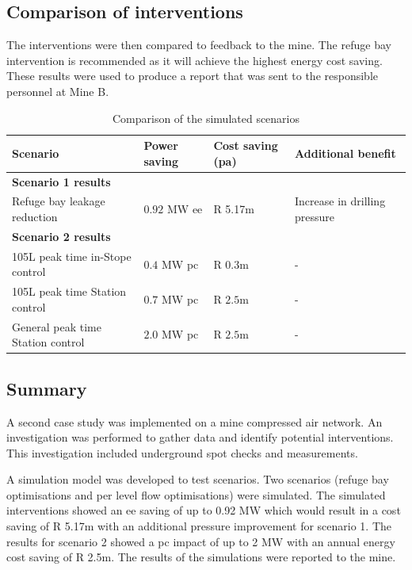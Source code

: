 	\subsection{Comparison of interventions}
	The interventions were then compared to feedback to the mine. The refuge bay intervention is recommended as it will achieve the highest energy cost saving. These results were used to produce a report that was sent to the responsible personnel at Mine B.
	\begin{table}[h!]
		\centering
		\begin{tabular}{p{}
				p{}
				p{}
				p{}}
			\hline 
			 \vspace{0.5em}Scenario & \vspace{0.5em}Power saving & Cost saving (\gls{pa}) & \vspace{0.5em}Additional benefit \\
			\hline
			\multicolumn{4}{l}{\textbf{Scenario 1 results}} \\
			Refuge bay leakage reduction & $ 0.92 $ MW \gls{ee} & R 5.17m & Increase in drilling pressure \\
			 
			\multicolumn{4}{l}{\textbf{Scenario 2 results}} \\
			105L peak time in-Stope control & $ 0.4 $ MW \gls{pc} & R $ 0.3 $m& - \\
			105L peak time Station control & $ 0.7 $ MW \gls{pc} & R $ 2.5 $m& - \\
			General peak time Station control & $ 2.0 $ MW \gls{pc} & R $ 2.5 $m& - \\
			\hline 
		\end{tabular}
		\caption{Comparison of the simulated scenarios}
		\label{Table: B Comparison}
	\end{table}
	\subsection{Summary}
	A second case study was implemented on a mine compressed air network. An investigation was performed to gather data and identify potential interventions. This investigation included underground spot checks and measurements.
	\par 
	 A simulation model was developed to test scenarios. Two scenarios (refuge bay optimisations and per level flow optimisations) were simulated. The simulated interventions showed an \gls{ee} saving of up to 0.92 MW which would result in a cost saving of R 5.17m with an additional pressure improvement for scenario 1. The results for scenario 2 showed a \gls{pc} impact of up to 2 MW with an annual energy cost saving of R 2.5m. The results of the simulations were reported to the mine.
